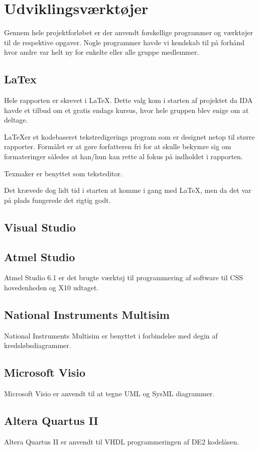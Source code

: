 \chapter{Udviklingsværktøjer}
Gennem hele projektforløbet er der anvendt forskellige programmer og værktøjer til de respektive opgaver. Nogle programmer havde vi kendskab til på forhånd hvor andre var helt ny for enkelte eller alle gruppe medlemmer.

\section{LaTex}
Hele rapporten er skrevet i \LaTeX. Dette valg kom i starten af projektet da IDA havde et tilbud om et gratis endags kursus, hvor hele gruppen blev enige om at deltage. 

\LaTeX er et kodebaseret tekstredigerings program som er designet netop til større rapporter. Formålet er at gøre forfatteren fri for at skulle bekymre sig om formateringer således at han/hun kan rette al fokus på indholdet i rapporten.

Texmaker er benyttet som teksteditor.

Det krævede dog lidt tid i starten at komme i gang med \LaTeX, men da det var på plads fungerede det rigtig godt. 

\section{Visual Studio}

\section{Atmel Studio}
Atmel Studio 6.1 er det brugte værktøj til programmering af software til CSS hovedenheden og X10 udtaget.

\section{National Instruments Multisim}
National Instruments Multisim er benyttet i forbindelse med degin af kredsløbsdiagrammer. 

\section{Microsoft Visio} %
Microsoft Visio er anvendt til at tegne UML og SysML diagrammer.

\section{Altera Quartus II}
Altera Quartus II er anvendt til VHDL programmeringen af DE2 kodelåsen.

